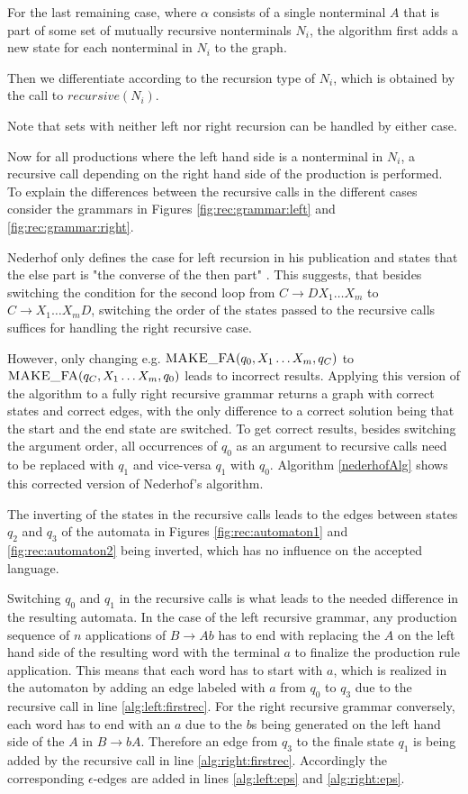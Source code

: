 For the last remaining case, where $\alpha$ consists of a single nonterminal $A$ that is part of some set of mutually recursive nonterminals $N_i$, the algorithm first adds a new state for each nonterminal in $N_i$ to the graph.

Then we differentiate according to the recursion type of $N_i$, which is obtained by the call to $recursive(N_i)$.

Note that sets with neither left nor right recursion can be handled by either case.

Now for all productions where the left hand side is a nonterminal in $N_i$, a recursive call depending on the right hand side of the production is performed. 
To explain the differences between the recursive calls in the different cases consider the grammars in Figures \ref{fig:rec:grammar:left} and \ref{fig:rec:grammar:right}.

Nederhof only defines the case for left recursion in his publication and states that the else part is "the converse of the then part" \cite{nederhof}. This suggests, that besides switching the condition for the second loop from $C \rightarrow DX_1 \ldots X_m$ to  $C \rightarrow X_1 \ldots X_mD$, switching the order of the states passed to the recursive calls suffices for handling the right recursive case.

However, only changing e.g. $\textproc{MAKE\_FA}(q_0, X_1 \ldots X_m, q_C)$ to $\textproc{MAKE\_FA}(q_C, X_1 \ldots X_m, q_0)$ leads to incorrect results. Applying this version of the algorithm to a fully right recursive grammar returns a graph with correct states and correct edges, with the only difference to a correct solution being that the start and the end state are switched. To get correct results, besides switching the argument order, all occurrences of $q_0$ as an argument to recursive calls need to be replaced with $q_1$ and vice-versa $q_1$ with $q_0$. Algorithm \ref{nederhofAlg} shows this corrected version of Nederhof's algorithm.

The inverting of the states in the recursive calls leads to the edges between states $q_2$ and $q_3$ of the automata in Figures \ref{fig:rec:automaton1} and \ref{fig:rec:automaton2} being inverted, which has no influence on the accepted language. 

Switching $q_0$ and $q_1$ in the recursive calls is what leads to the needed difference in the resulting automata. In the case of the left recursive grammar, any production sequence of $n$ applications of $B \rightarrow Ab$ has to end with replacing the $A$ on the left hand side of the resulting word with the terminal $a$ to finalize the production rule application. This means that each word has to start with $a$, which is realized in the automaton by adding an edge labeled with $a$ from $q_0$ to $q_3$ due to the recursive call in line \ref{alg:left:firstrec}. For the right recursive grammar conversely, each word has to end with an $a$ due to the $b$s being generated on the left hand side of the $A$ in $B \rightarrow bA$. Therefore an edge from $q_3$ to the finale state $q_1$ is being added by the recursive call in line \ref{alg:right:firstrec}.
Accordingly the corresponding $\epsilon$-edges are added in lines \ref{alg:left:eps} and \ref{alg:right:eps}.


